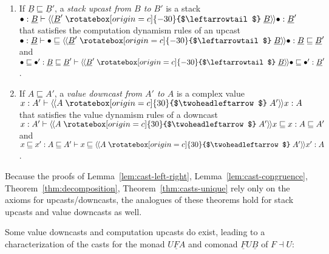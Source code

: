 \documentclass[acmsmall,screen,12pt]{acmart}
\renewcommand{\u}{\underline}
\newcommand{\ltdyn}{\sqsubseteq}
\newcommand{\uarrow}{\mathrel{\rotatebox[origin=c]{-30}{$\leftarrowtail$}}}
\newcommand{\darrow}{\mathrel{\rotatebox[origin=c]{30}{$\twoheadleftarrow$}}}
\newcommand{\defupcast}[2]{\langle\kern-1ex~\langle{#2}\uarrow{#1}\rangle\kern-1ex~\rangle}
\newcommand{\defdncast}[2]{\langle\kern-1ex~\langle{#1}\darrow{#2}\rangle\kern-1ex~\rangle}
\begin{document}
\begin{definition} \label{def:value-down-computation-up} ~
\begin{enumerate}
\item
  If $\u B \ltdyn \u B'$, a \emph{stack upcast from $B$ to $B'$}
  is a stack $\bullet : \u B \vdash \defupcast{\u B}{\u B'} \bullet : \u
  B'$ that satisfies the computation dynamism rules of an upcast
  ${\bullet : \u B \vdash \bullet \ltdyn \defupcast{\u B}{\u B'} \bullet
    : \u B \ltdyn \u B'}$ and
  ${\bullet \ltdyn \bullet' : \u B \ltdyn \u B' \vdash \defupcast{\u B}{\u B'} \bullet \ltdyn \bullet' : \u B'}$.
    
\item If $A \ltdyn A'$, a \emph{value downcast from $A'$ to $A$} is a
  complex value $x : A' \vdash \defdncast{A}{A'} x : A$ that satisfies
  the value dynamism rules of a downcast
  ${x : A' \vdash \defdncast{A}{A'}{x} \ltdyn x : A \ltdyn A'}$
  and
  ${x \ltdyn x' : A \ltdyn A' \vdash x \ltdyn \defdncast{A}{A'} x' : A}$.
\end{enumerate}
\end{definition}
\begin{longonly}
Because the proofs of Lemma~\ref{lem:cast-left-right},
Lemma~\ref{lem:cast-congruence}, Theorem~\ref{thm:decomposition},
Theorem~\ref{thm:casts-unique} rely only on the axioms for
upcasts/downcasts, the analogues of these theorems hold for stack
upcasts and value downcasts as well.
\end{longonly}
Some value downcasts and computation upcasts do exist, leading to a
characterization of the casts for the monad $U \u F A$ and comonad $\u F
U \u B$ of $F \dashv U$:
\end{document}
